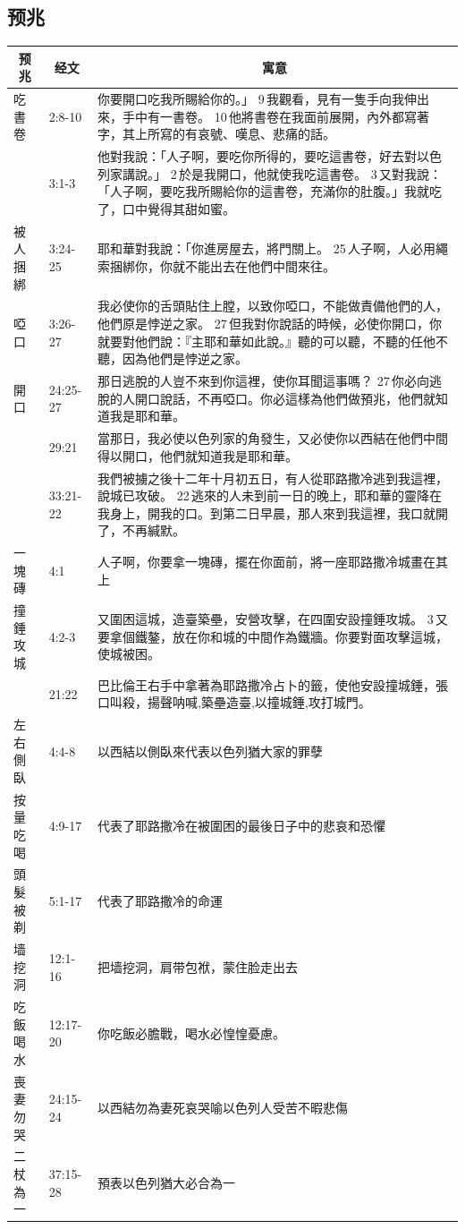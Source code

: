 \subsection{预兆}
\begin{table}[H]
\centering
\begin{tabular}{p{1.75cm}|p{1.50cm}|p{13.0cm}}\hline\hline
\multicolumn{1}{c|}{预兆}&\multicolumn{1}{c|}{经文}&\multicolumn{1}{c}{寓意}\\\hline
吃書卷&2:8-10&你要開口吃我所賜給你的。」 9 我觀看，見有一隻手向我伸出來，手中有一書卷。 10 他將書卷在我面前展開，內外都寫著字，其上所寫的有哀號、嘆息、悲痛的話。\\\hline
&3:1-3&他對我說：「人子啊，要吃你所得的，要吃這書卷，好去對以色列家講說。」 2 於是我開口，他就使我吃這書卷。 3 又對我說：「人子啊，要吃我所賜給你的這書卷，充滿你的肚腹。」我就吃了，口中覺得其甜如蜜。\\\hline

被人捆綁&3:24-25&耶和華對我說：「你進房屋去，將門關上。 25 人子啊，人必用繩索捆綁你，你就不能出去在他們中間來往。\\\hline

啞口&3:26-27&我必使你的舌頭貼住上膛，以致你啞口，不能做責備他們的人，他們原是悖逆之家。 27 但我對你說話的時候，必使你開口，你就要對他們說：『主耶和華如此說。』聽的可以聽，不聽的任他不聽，因為他們是悖逆之家。\\\hline
開口&24:25-27&那日逃脫的人豈不來到你這裡，使你耳聞這事嗎？ 27 你必向逃脫的人開口說話，不再啞口。你必這樣為他們做預兆，他們就知道我是耶和華。\\\hline
&29:21&當那日，我必使以色列家的角發生，又必使你以西結在他們中間得以開口，他們就知道我是耶和華。\\\hline
&33:21-22&我們被擄之後十二年十月初五日，有人從耶路撒冷逃到我這裡，說城已攻破。 22 逃來的人未到前一日的晚上，耶和華的靈降在我身上，開我的口。到第二日早晨，那人來到我這裡，我口就開了，不再緘默。\\\hline

一塊磚&4:1&人子啊，你要拿一塊磚，擺在你面前，將一座耶路撒冷城畫在其上\\\hline
撞錘攻城&4:2-3&又圍困這城，造臺築壘，安營攻擊，在四圍安設撞錘攻城。 3 又要拿個鐵鏊，放在你和城的中間作為鐵牆。你要對面攻擊這城，使城被困。\\\hline
&21:22&巴比倫王右手中拿著為耶路撒冷占卜的籤，使他安設撞城錘，張口叫殺，揚聲呐喊,築壘造臺,以撞城錘,攻打城門。\\\hline
左右側臥&4:4-8&以西結以側臥來代表以色列猶大家的罪孽\\\hline
按量吃喝&4:9-17&代表了耶路撒冷在被圍困的最後日子中的悲哀和恐懼\\\hline
頭髮被剃&5:1-17&代表了耶路撒冷的命運\\\hline
墙挖洞&12:1-16&把墙挖洞，肩带包袱，蒙住脸走出去\\\hline
吃飯喝水&12:17-20&你吃飯必膽戰，喝水必惶惶憂慮。\\\hline
喪妻勿哭&24:15-24&以西結勿為妻死哀哭喻以色列人受苦不暇悲傷\\\hline

二杖為一&37:15-28&預表以色列猶大必合為一\\\hline
\end{tabular}
\end{table}


